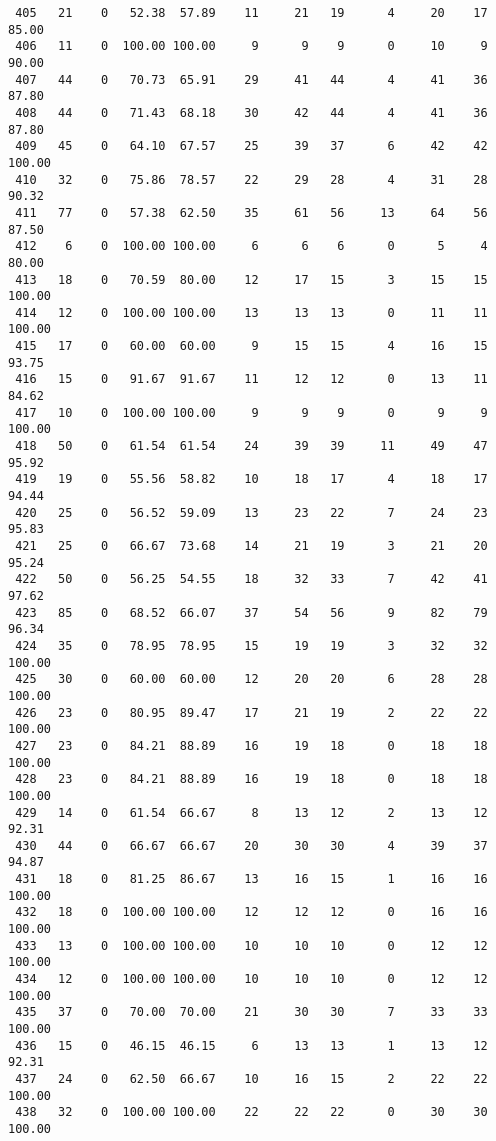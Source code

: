 \begin{verbatim}
 405   21    0   52.38  57.89    11     21   19      4     20    17    85.00
 406   11    0  100.00 100.00     9      9    9      0     10     9    90.00
 407   44    0   70.73  65.91    29     41   44      4     41    36    87.80
 408   44    0   71.43  68.18    30     42   44      4     41    36    87.80
 409   45    0   64.10  67.57    25     39   37      6     42    42   100.00
 410   32    0   75.86  78.57    22     29   28      4     31    28    90.32
 411   77    0   57.38  62.50    35     61   56     13     64    56    87.50
 412    6    0  100.00 100.00     6      6    6      0      5     4    80.00
 413   18    0   70.59  80.00    12     17   15      3     15    15   100.00
 414   12    0  100.00 100.00    13     13   13      0     11    11   100.00
 415   17    0   60.00  60.00     9     15   15      4     16    15    93.75
 416   15    0   91.67  91.67    11     12   12      0     13    11    84.62
 417   10    0  100.00 100.00     9      9    9      0      9     9   100.00
 418   50    0   61.54  61.54    24     39   39     11     49    47    95.92
 419   19    0   55.56  58.82    10     18   17      4     18    17    94.44
 420   25    0   56.52  59.09    13     23   22      7     24    23    95.83
 421   25    0   66.67  73.68    14     21   19      3     21    20    95.24
 422   50    0   56.25  54.55    18     32   33      7     42    41    97.62
 423   85    0   68.52  66.07    37     54   56      9     82    79    96.34
 424   35    0   78.95  78.95    15     19   19      3     32    32   100.00
 425   30    0   60.00  60.00    12     20   20      6     28    28   100.00
 426   23    0   80.95  89.47    17     21   19      2     22    22   100.00
 427   23    0   84.21  88.89    16     19   18      0     18    18   100.00
 428   23    0   84.21  88.89    16     19   18      0     18    18   100.00
 429   14    0   61.54  66.67     8     13   12      2     13    12    92.31
 430   44    0   66.67  66.67    20     30   30      4     39    37    94.87
 431   18    0   81.25  86.67    13     16   15      1     16    16   100.00
 432   18    0  100.00 100.00    12     12   12      0     16    16   100.00
 433   13    0  100.00 100.00    10     10   10      0     12    12   100.00
 434   12    0  100.00 100.00    10     10   10      0     12    12   100.00
 435   37    0   70.00  70.00    21     30   30      7     33    33   100.00
 436   15    0   46.15  46.15     6     13   13      1     13    12    92.31
 437   24    0   62.50  66.67    10     16   15      2     22    22   100.00
 438   32    0  100.00 100.00    22     22   22      0     30    30   100.00

\end{verbatim}
